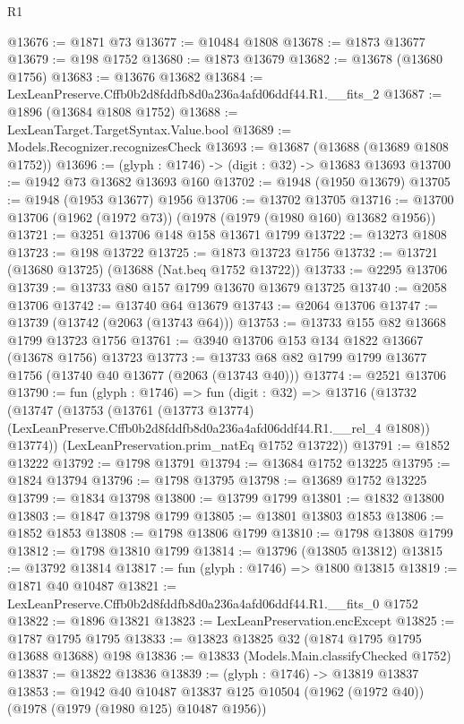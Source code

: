 \begin{lexlean}{R1}
\begin{coremodule}
@13676 := @1871 @73
@13677 := @10484 @1808
@13678 := @1873 @13677
@13679 := @198 @1752
@13680 := @1873 @13679
@13682 := @13678 (@13680 @1756)
@13683 := @13676 @13682
@13684 := LexLeanPreserve.Cffb0b2d8fddfb8d0a236a4afd06ddf44.R1.__fits_2
@13687 := @1896 (@13684 @1808 @1752)
@13688 := LexLeanTarget.TargetSyntax.Value.bool
@13689 := Models.Recognizer.recognizesCheck
@13693 := @13687 (@13688 (@13689 @1808 @1752))
@13696 := (glyph : @1746) -> (digit : @32) -> @13683 @13693
@13700 := @1942 @73 @13682 @13693 @160
@13702 := @1948 (@1950 @13679)
@13705 := @1948 (@1953 @13677) @1956
@13706 := @13702 @13705
@13716 := @13700 @13706 (@1962 (@1972 @73)) (@1978 (@1979 (@1980 @160) @13682 @1956))
@13721 := @3251 @13706 @148 @158 @13671 @1799
@13722 := @13273 @1808
@13723 := @198 @13722
@13725 := @1873 @13723 @1756
@13732 := @13721 (@13680 @13725) (@13688 (Nat.beq @1752 @13722))
@13733 := @2295 @13706
@13739 := @13733 @80 @157 @1799 @13670 @13679 @13725
@13740 := @2058 @13706
@13742 := @13740 @64 @13679
@13743 := @2064 @13706
@13747 := @13739 (@13742 (@2063 (@13743 @64)))
@13753 := @13733 @155 @82 @13668 @1799 @13723 @1756
@13761 := @3940 @13706 @153 @134 @1822 @13667 (@13678 @1756) @13723
@13773 := @13733 @68 @82 @1799 @1799 @13677 @1756 (@13740 @40 @13677 (@2063 (@13743 @40)))
@13774 := @2521 @13706
@13790 := fun (glyph : @1746) =>
  fun (digit : @32) =>
  @13716
    (@13732
      (@13747
        (@13753
          (@13761
            (@13773 @13774)
            (LexLeanPreserve.Cffb0b2d8fddfb8d0a236a4afd06ddf44.R1.__rel_4 @1808))
          @13774))
      (LexLeanPreservation.prim_natEq @1752 @13722))
@13791 := @1852 @13222
@13792 := @1798 @13791
@13794 := @13684 @1752 @13225
@13795 := @1824 @13794
@13796 := @1798 @13795
@13798 := @13689 @1752 @13225
@13799 := @1834 @13798
@13800 := @13799 @1799
@13801 := @1832 @13800
@13803 := @1847 @13798 @1799
@13805 := @13801 @13803 @1853
@13806 := @1852 @1853
@13808 := @1798 @13806 @1799
@13810 := @1798 @13808 @1799
@13812 := @1798 @13810 @1799
@13814 := @13796 (@13805 @13812)
@13815 := @13792 @13814
@13817 := fun (glyph : @1746) => @1800 @13815
@13819 := @1871 @40 @10487
@13821 := LexLeanPreserve.Cffb0b2d8fddfb8d0a236a4afd06ddf44.R1.__fits_0 @1752
@13822 := @1896 @13821
@13823 := LexLeanPreservation.encExcept
@13825 := @1787 @1795 @1795
@13833 := @13823 @13825 @32 (@1874 @1795 @1795 @13688 @13688) @198
@13836 := @13833 (Models.Main.classifyChecked @1752)
@13837 := @13822 @13836
@13839 := (glyph : @1746) -> @13819 @13837
@13853 := @1942
    @40
    @10487
    @13837
    @125
    @10504
    (@1962 (@1972 @40))
    (@1978 (@1979 (@1980 @125) @10487 @1956))

\end{coremodule}
\end{lexlean}
